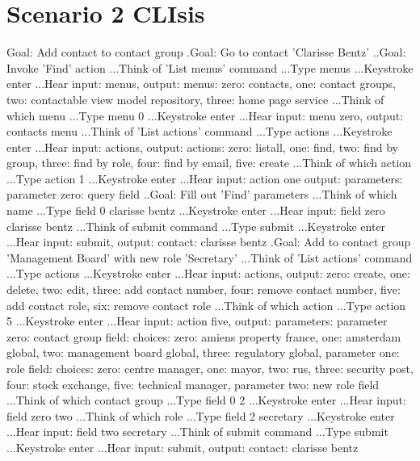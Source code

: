 \section{Scenario 2 CLIsis}
\label{section:scenario2clisis}
\begin{spverbatim}
Goal: Add contact to contact group
.Goal: Go to contact 'Clarisse Bentz'
..Goal: Invoke 'Find' action
...Think of 'List menus' command
...Type menus
...Keystroke enter
...Hear input: menus, output: menus: zero: contacts, one: contact groups, two: contactable view model repository, three: home page service
...Think of which menu
...Type menu 0
...Keystroke enter
...Hear input: menu zero, output: contacts menu
...Think of 'List actions' command
...Type actions
...Keystroke enter
...Hear input: actions, output: actions: zero: listall, one: find, two: find by group, three: find by role, four: find by email, five: create
...Think of which action
...Type action 1
...Keystroke enter
...Hear input: action one output: parameters: parameter zero: query field
..Goal: Fill out 'Find' parameters
...Think of which name
...Type field 0 clarisse bentz
...Keystroke enter
...Hear input: field zero clarisse bentz
...Think of submit command
...Type submit
...Keystroke enter
...Hear input: submit, output: contact: clarisse bentz
.Goal: Add to contact group 'Management Board' with new role 'Secretary'
...Think of 'List actions' command
...Type actions
...Keystroke enter
...Hear input: actions, output: zero: create, one: delete, two: edit, three: add contact number, four: remove contact number, five: add contact role, six: remove contact role
...Think of which action
...Type action 5
...Keystroke enter
...Hear input: action five, output: parameters: parameter zero: contact group field: choices: zero: amiens property france, one: amsterdam global, two: management board global, three: regulatory global, parameter one: role field: choices: zero: centre manager, one: mayor, two: rus, three: security post, four: stock exchange, five: technical manager, parameter two: new role field
...Think of which contact group
...Type field 0 2
...Keystroke enter
...Hear input: field zero two
...Think of which role
...Type field 2 secretary
...Keystroke enter
...Hear input: field two secretary
...Think of submit command
...Type submit
...Keystroke enter
...Hear input: submit, output: contact: clarisse bentz
\end{spverbatim}

